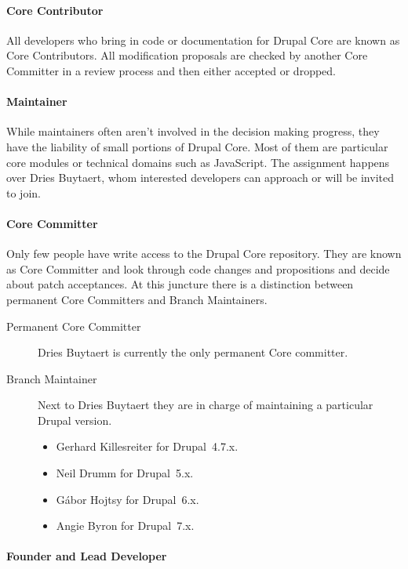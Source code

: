 \paragraph{Core Contributor}

All developers who bring in code or documentation for Drupal Core are known as
Core Contributors. All modification proposals are checked by another Core
Committer in a review process and then either accepted or dropped.

\paragraph{Maintainer}

While maintainers often aren't involved in the decision making progress, they
have the liability of small portions of Drupal Core. Most of them are
particular core modules or technical domains such as JavaScript. The assignment
happens over Dries Buytaert, whom interested developers can approach or will be
invited to join.

\paragraph{Core Committer}

Only few people have write access to the Drupal Core repository. They are known
as Core Committer and look through code changes and propositions and decide
about patch acceptances. At this juncture there is a distinction between
permanent Core Committers and Branch Maintainers.

\begin{description}
  \item[Permanent Core Committer] Dries Buytaert is currently the only permanent Core
    committer.
  \item[Branch Maintainer] Next to Dries Buytaert they are in charge of
  maintaining a particular Drupal version.
  \begin{itemize}
    \item Gerhard Killesreiter for Drupal~4.7.x.
    \item Neil Drumm for Drupal~5.x.
    \item Gábor Hojtsy for Drupal~6.x.
    \item Angie Byron for Drupal~7.x.
  \end{itemize}
\end{description}

\paragraph{Founder and Lead Developer}

